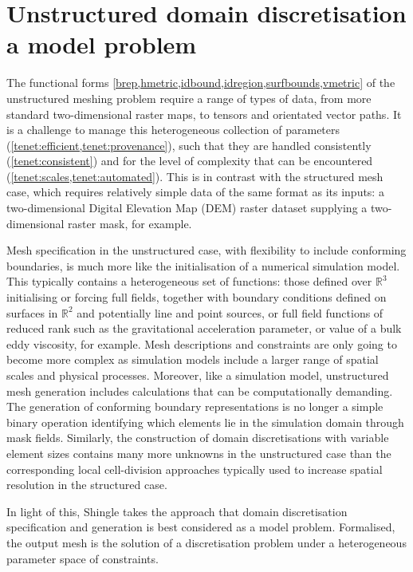 \documentclass[a4paper, 10pt]{book}
\providecommand{\shingle}{Shingle\xspace}
\providecommand{\twod}{two-dimensional\xspace}
\begin{document}
\section{Unstructured domain discretisation a model problem}
%
The functional forms \cref{brep,hmetric,idbound,idregion,surfbounds,vmetric}
of the unstructured meshing problem
require a range of types of data,
from more standard \twod raster maps, to tensors and orientated vector paths.
%
It is a challenge to manage this heterogeneous collection of parameters (\cref{tenet:efficient,tenet:provenance}),
such that they are handled consistently (\cref{tenet:consistent})
and for the level of complexity that can be encountered (\cref{tenet:scales,tenet:automated}).
%
This is in contrast with the structured mesh case, which requires relatively simple data of the same format as its
inputs:
a \twod Digital Elevation Map (DEM) raster dataset supplying a \twod raster mask, for example.

Mesh specification in the unstructured case,
with flexibility to include conforming boundaries,
is much more like the initialisation of a numerical simulation model.
%
This typically contains a heterogeneous set of functions:
those defined over
$\mathbb{R}^3$ initialising or forcing full fields, together with boundary conditions defined on surfaces in $\mathbb{R}^2$ and
potentially line and point sources, or full field functions of reduced rank such as the gravitational acceleration parameter,
or value of a bulk eddy viscosity, for example.
%
Mesh descriptions and constraints are only going to become more complex as simulation models include a larger range of spatial scales and physical processes.
%
Moreover, like a simulation model, unstructured mesh generation includes calculations that can be computationally demanding.
The generation of conforming boundary representations is no longer a simple binary operation identifying which elements lie in the simulation domain through mask fields.
%
Similarly, the construction of domain discretisations with variable element sizes contains many more unknowns
in the unstructured case than the corresponding
local cell-division approaches typically used to increase spatial resolution in the structured case.

In light of this,
\shingle takes the approach that domain discretisation specification and generation is best considered as a model problem.
%
Formalised, the output mesh is the solution of a discretisation problem under a heterogeneous parameter space of constraints.
\end{document}
